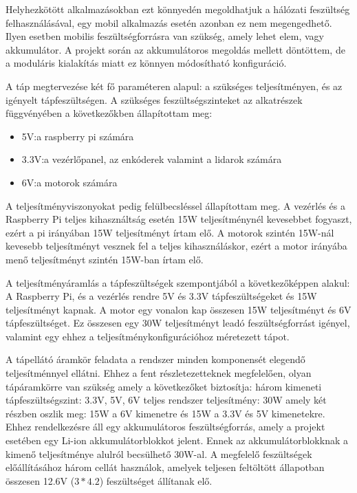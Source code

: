Helyhezkötött alkalmazásokban ezt könnyedén megoldhatjuk a hálózati feszültség
felhasználásával, egy mobil alkalmazás esetén azonban ez nem megengedhető. Ilyen
esetben mobilis feszültségforrásra van szükség, amely lehet elem, vagy
akkumulátor. A projekt során az akkumulátoros megoldás mellett döntöttem, de
a moduláris kialakítás miatt ez könnyen módosítható konfiguráció.

\medskip

A táp megtervezése két fő paraméteren alapul: a szükséges teljesítményen, és az
igényelt tápfeszültségen. A szükséges feszültségszinteket az alkatrészek
függvényében a következőkben állapítottam meg:

\begin{itemize}
\item 5V:\@ a raspberry pi számára
\item 3.3V:\@ a vezérlőpanel, az enkóderek valamint a lidarok számára
\item 6V:\@ a motorok számára
\end{itemize}

A teljesítményviszonyokat pedig felülbecsléssel állapítottam meg. A vezérlés és
a Raspberry Pi teljes kihasználtság esetén 15W teljesítménynél kevesebbet
fogyaszt, ezért a pi irányában 15W teljesítményt írtam elő. A motorok szintén
15W-nál kevesebb teljesítményt vesznek fel a teljes kihasználáskor, ezért a motor
irányába menő teljesítményt szintén 15W-ban írtam elő.

A teljesítményáramlás a tápfeszültségek szempontjából a következőképpen alakul:
A Raspberry Pi, és a vezérlés rendre 5V és 3.3V tápfeszültségeket és 15W
teljesítményt kapnak. A motor egy vonalon kap összesen 15W teljesítményt és 6V
tápfeszültséget. Ez összesen egy 30W teljesítményt leadó feszültségforrást
igényel, valamint egy ehhez a teljesítménykonfigurációhoz méretezett tápot.

A tápellátó áramkör feladata a rendszer minden komponensét elegendő
teljesítménnyel ellátni. Ehhez a fent részletezetteknek megfelelően, olyan
tápáramkörre van szükség amely a következőket biztosítja: három kimeneti
tápfeszültségszint: 3.3V, 5V, 6V teljes rendszer
teljesítmény: 30W amely két részben oszlik meg: 15W a
6V kimenetre és 15W a 3.3V és 5V kimenetekre.
Ehhez rendelkezésre áll egy akkumulátoros feszültségforrás, amely a projekt
esetében egy Li-ion akkumulátorblokkot jelent. Ennek az akkumulátorblokknak a
kimenő teljesítménye alulról becsülhető 30W-al. A megfelelő feszültségek
előállításához három cellát használok, amelyek teljesen feltöltött állapotban
összesen 12.6V (\(3 * 4.2\)) feszültséget állítanak elő.

